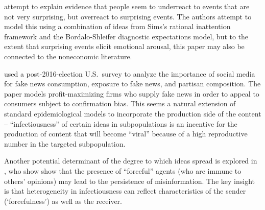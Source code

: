 \cite{kohlhasasymmetric} attempt to explain evidence that people seem to underreact to events that are not very surprising, but overreact to surprising events.  The authors attempt to model this using a combination of ideas from Sims's rational inattention framework and the Bordalo-Shleifer diagnostic expectations model, but to the extent that surprising events elicit emotional arousal, this paper may also be connected to the noneconomic literature.  %


\href{https://github.com/iworld1991/EpiExp/blob/master/Literature/allcott2017social.pdf}{\cite{allcott2017social}} used a post-2016-election U.S.\ survey to analyze the importance of social media for fake news consumption, exposure to fake news, and partisan composition.  The paper models profit-maximizing firms who supply fake news in order to appeal to consumers subject to confirmation bias. This seems a natural extension of standard epidemiological models to incorporate the production side of the content -- ``infectiousness'' of certain ideas in subpopulations is an incentive for the production of content that will become ``viral'' because of a high reproductive number in the targeted subpopulation.

Another potential determinant of the degree to which ideas spread is explored in \href{https://www.kdd.org/exploration_files/8._CR.10.Misinformation_in_social_media_-_Final.pdf}{\cite{acemoglu2010spread}}, who show show that the presence of ``forceful'' agents (who are immune to others' opinions) may lead to the persistence of misinformation. The key insight is that heterogeneity in infectiousness can reflect characteristics of the sender (`forcefulness') as well as the receiver.

